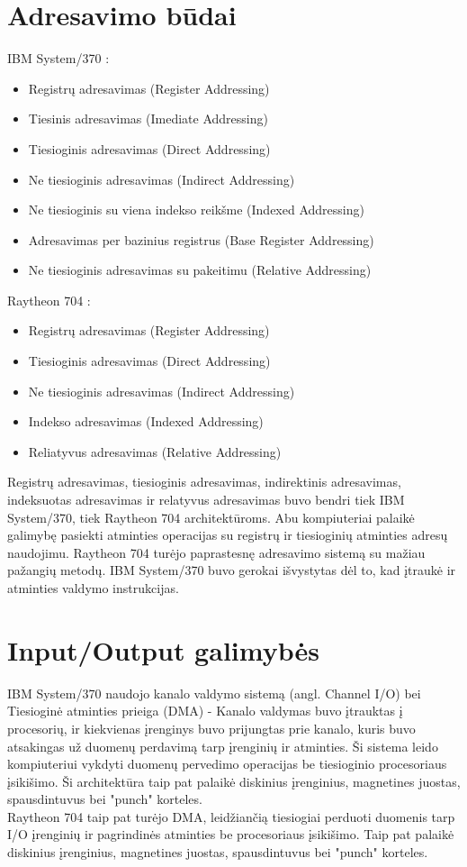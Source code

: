 \documentclass{article}
\begin{document}
\section*{Adresavimo būdai}
IBM System/370 :
\begin{itemize}
    \item Registrų adresavimas (Register Addressing)
    \item Tiesinis adresavimas (Imediate Addressing)
    \item Tiesioginis adresavimas (Direct Addressing)
    \item Ne tiesioginis adresavimas (Indirect Addressing)
    \item Ne tiesioginis su viena indekso reikšme (Indexed Addressing)
    \item Adresavimas per bazinius registrus (Base Register Addressing)
    \item Ne tiesioginis adresavimas su pakeitimu (Relative Addressing)
\end{itemize}
Raytheon 704 :
\begin{itemize}
    \item Registrų adresavimas (Register Addressing)
    \item Tiesioginis adresavimas (Direct Addressing)
    \item Ne tiesioginis adresavimas (Indirect Addressing)
    \item Indekso adresavimas (Indexed Addressing)
    \item Reliatyvus adresavimas (Relative Addressing)
\end{itemize}
Registrų adresavimas, tiesioginis adresavimas, indirektinis adresavimas, indeksuotas adresavimas ir relatyvus adresavimas buvo bendri tiek IBM System/370, tiek Raytheon 704 architektūroms. Abu kompiuteriai palaikė galimybę pasiekti atminties operacijas su registrų ir tiesioginių atminties adresų naudojimu. Raytheon 704 turėjo paprastesnę adresavimo sistemą su mažiau pažangių metodų. IBM System/370 buvo gerokai išvystytas dėl to, kad įtraukė ir atminties valdymo instrukcijas.

\section*{Input/Output galimybės}
IBM System/370 naudojo kanalo valdymo sistemą (angl. Channel I/O) bei Tiesioginė atminties prieiga (DMA) - Kanalo valdymas buvo įtrauktas į procesorių, ir kiekvienas įrenginys buvo prijungtas prie kanalo, kuris buvo atsakingas už duomenų perdavimą tarp įrenginių ir atminties. Ši sistema leido kompiuteriui vykdyti duomenų pervedimo operacijas be tiesioginio procesoriaus įsikišimo. Ši architektūra taip pat palaikė diskinius įrenginius, magnetines juostas, spausdintuvus bei "punch" korteles.
\\
Raytheon 704 taip pat turėjo DMA, leidžiančią tiesiogiai perduoti duomenis tarp I/O įrenginių ir pagrindinės atminties be procesoriaus įsikišimo. Taip pat palaikė diskinius įrenginius, magnetines juostas, spausdintuvus bei "punch" korteles.
\end{document}
